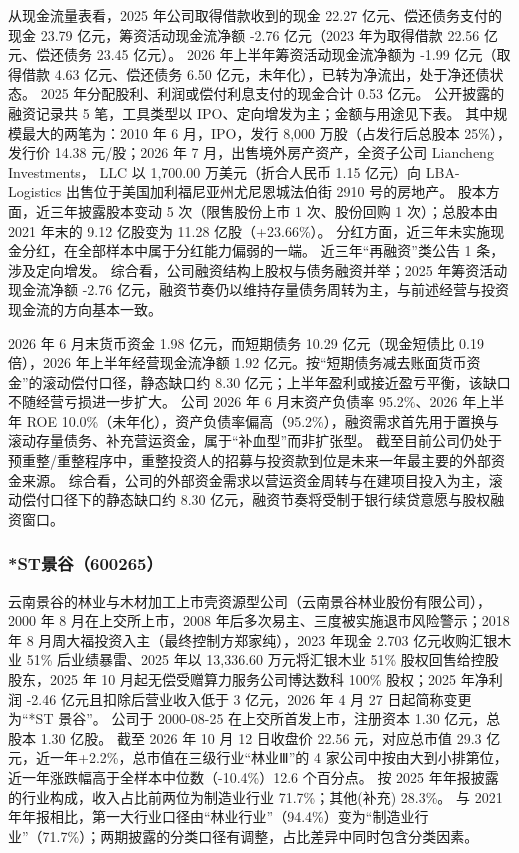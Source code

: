 从现金流量表看，2025 年公司取得借款收到的现金 22.27 亿元、偿还债务支付的现金 23.79 亿元，筹资活动现金流净额 -2.76 亿元（2023 年为取得借款 22.56 亿元、偿还债务 23.45 亿元）。 2026 年上半年筹资活动现金流净额为 -1.99 亿元（取得借款 4.63 亿元、偿还债务 6.50 亿元，未年化），已转为净流出，处于净还债状态。 2025 年分配股利、利润或偿付利息支付的现金合计 0.53 亿元。 公开披露的融资记录共 5 笔，工具类型以 IPO、定向增发为主；金额与用途见下表。 其中规模最大的两笔为：2010 年 6 月，IPO，发行 8,000 万股（占发行后总股本 25\%），发行价 14.38 元/股；2026 年 7 月，出售境外房产资产，全资子公司 Liancheng Investments， LLC 以 1,700.00 万美元（折合人民币 1.15 亿元）向 LBA-Logistics 出售位于美国加利福尼亚州尤尼恩城法伯街 2910 号的房地产。 股本方面，近三年披露股本变动 5 次（限售股份上市 1 次、股份回购 1 次）；总股本由 2021 年末的 9.12 亿股变为 11.28 亿股（+23.66\%）。 分红方面，近三年未实施现金分红，在全部样本中属于分红能力偏弱的一端。 近三年“再融资”类公告 1 条，涉及定向增发。 综合看，公司融资结构上股权与债务融资并举；2025 年筹资活动现金流净额 -2.76 亿元，融资节奏仍以维持存量债务周转为主，与前述经营与投资现金流的方向基本一致。

 2026 年 6 月末货币资金 1.98 亿元，而短期债务 10.29 亿元（现金短债比 0.19 倍），2026 年上半年经营现金流净额 1.92 亿元。按“短期债务减去账面货币资金”的滚动偿付口径，静态缺口约 8.30 亿元；上半年盈利或接近盈亏平衡，该缺口不随经营亏损进一步扩大。 公司 2026 年 6 月末资产负债率 95.2\%、2026 年上半年 ROE 10.0\%（未年化），资产负债率偏高（95.2\%），融资需求首先用于置换与滚动存量债务、补充营运资金，属于“补血型”而非扩张型。 截至目前公司仍处于预重整/重整程序中，重整投资人的招募与投资款到位是未来一年最主要的外部资金来源。 综合看，公司的外部资金需求以营运资金周转与在建项目投入为主，滚动偿付口径下的静态缺口约 8.30 亿元，融资节奏将受制于银行续贷意愿与股权融资窗口。




\subsubsection{*ST景谷（600265）}
\label{co:600265}

 云南景谷的林业与木材加工上市壳资源型公司（云南景谷林业股份有限公司），2000 年 8 月在上交所上市，2008 年后多次易主、三度被实施退市风险警示；2018 年 8 月周大福投资入主（最终控制方郑家纯），2023 年现金 2.703 亿元收购汇银木业 51\% 后业绩暴雷、2025 年以 13,336.60 万元将汇银木业 51\% 股权回售给控股股东，2025 年 10 月起无偿受赠算力服务公司博达数科 100\% 股权；2025 年净利润 -2.46 亿元且扣除后营业收入低于 3 亿元，2026 年 4 月 27 日起简称变更为“*ST 景谷”。 公司于 2000-08-25 在上交所首发上市，注册资本 1.30 亿元，总股本 1.30 亿股。 截至 2026 年 10 月 12 日收盘价 22.56 元，对应总市值 29.3 亿元，近一年+2.2\%，总市值在三级行业“林业Ⅲ”的 4 家公司中按由大到小排第位，近一年涨跌幅高于全样本中位数（-10.4\%）12.6 个百分点。 按 2025 年年报披露的行业构成，收入占比前两位为制造业行业 71.7\%；其他(补充) 28.3\%。 与 2021 年年报相比，第一大行业口径由“林业行业”（94.4\%）变为“制造业行业”（71.7\%）；两期披露的分类口径有调整，占比差异中同时包含分类因素。

